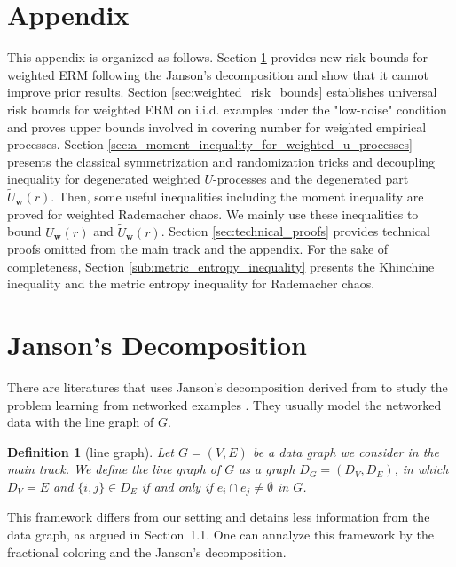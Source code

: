 \documentclass[letterpaper]{article} %
\newtheorem{definition}{Definition}
\newcommand{\weight}{\mathbf{w}}
\newcommand{\edge}[1]{\{#1\}}
\newcommand{\red}[1]{\textcolor{red}{#1}}
\newcommand{\todo}[1]{\red{\textsc{todo:} #1}}
\begin{document}



\newpage\newpage

\section*{Appendix} %
\appendix
\label{sec:appendix}

This appendix is organized as follows. Section \ref{sec:fractional_coloring_approach} 
provides new risk bounds for weighted ERM following the Janson's decomposition and show that it cannot improve prior results. 
Section \ref{sec:weighted_risk_bounds} establishes universal risk bounds for weighted ERM on i.i.d. examples under the "low-noise" condition and proves upper bounds involved in covering number for weighted empirical processes. 
Section \ref{sec:a_moment_inequality_for_weighted_u_processes} presents the classical symmetrization and randomization tricks and decoupling inequality for degenerated weighted $U$-processes and the degenerated part $\widetilde{U}_\weight{}(r)$.
Then, some useful inequalities including the moment inequality are proved for weighted Rademacher chaos.
We mainly use these inequalities to bound $U_\weight{}(r)$ and $\widetilde{U}_\weight{}(r)$.
Section \ref{sec:technical_proofs} provides technical proofs omitted from the main track and the appendix.
For the sake of completeness, Section \ref{sub:metric_entropy_inequality} presents the Khinchine inequality and the metric entropy inequality for Rademacher chaos.

\section{Janson's Decomposition} %
\label{sec:fractional_coloring_approach}

There are literatures that uses Janson's decomposition derived from \cite{janson2004large} to study the problem learning from networked examples \cite{Usunier2005,Biau2006,ralaivola2009chromatic,DBLP:conf/icml/RalaivolaA15}.
They usually model the networked data with the line graph of $G$.
\begin{definition}[line graph]
  \label{de:line graph}
  Let $G=(V,E)$ be a data graph we consider in the main track. We define the line graph of $G$ as a graph $D_G = (D_V, D_E)$, in which $D_V = E$ and $\edge{i,j}\in D_E$ if and only if $e_i\cap e_j\neq\emptyset$ in $G$.
\end{definition}
This framework differs from our setting and detains less information from the data graph, as argued in Section~1.1. 
One can annalyze this framework by the fractional coloring and the Janson's decomposition.
\end{document}
